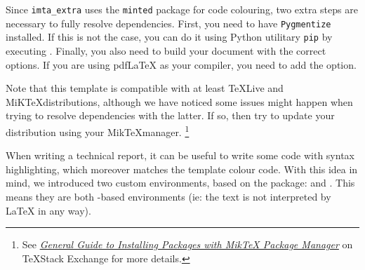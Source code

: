 \documentclass{report}
\begin{document}
Since \texttt{imta\_extra} uses the \texttt{minted} package for code colouring, two extra steps are necessary to fully resolve dependencies. 
First, you need to have \texttt{Pygmentize} installed. 
If this is not the case, you can do it using Python utilitary \texttt{pip} by executing . 
Finally, you also need to build your document with the correct options. 
If you are using pdf\LaTeX{} as your compiler, you need to add the  option.

Note that this template is compatible with at least \TeX Live and MiK\TeX distributions, although we have noticed some issues might happen when trying to resolve dependencies with the latter. If so, then try to update your distribution using your Mik\TeX manager.
\footnote{See \textit{\href{https://tex.stackexchange.com/a/359851}{General Guide to Installing Packages with MikTeX Package Manager}} on \TeX Stack Exchange for more details.}



When writing a technical report, it can be useful to write some code with syntax highlighting, which moreover matches the template colour code.
 With this idea in mind, we introduced two custom environments, based on the  package:  and . 
 This means they are both -based environments (ie: the text is not interpreted by \LaTeX{} in any way).
\end{document}

